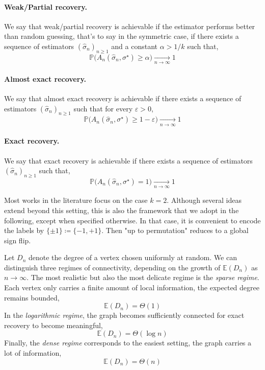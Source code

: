 \documentclass[runningheads]{llncs}
\begin{document}
\paragraph{Weak/Partial recovery.}
We say that weak/partial recovery is achievable if the estimator performs better than random guessing, that's to say in the symmetric case, if there exists a sequence of estimators \((\hat{\sigma}_n)_{n\geq 1}\) and a constant \(\alpha>1/k\) such that,
\[
\mathbb P\bigl(A_n(\hat{\sigma}_n,\sigma^\star)\geq \alpha\bigr)\xrightarrow[n\to\infty]{} 1
\]
\paragraph{Almost exact recovery.}
We say that almost exact recovery is achievable if there exists a sequence of estimators \((\hat{\sigma}_n)_{n\geq 1}\) such that for every \(\varepsilon>0\),
\[
\mathbb P\bigl(A_n(\hat{\sigma}_n,\sigma^\star)\geq 1-\varepsilon\bigr)\xrightarrow[n\to\infty]{} 1
\]
\paragraph{Exact recovery.}
We say that exact recovery is achievable if there exists a sequence of estimators \((\hat{\sigma}_n)_{n\geq 1}\) such that,
\[
\mathbb P\bigl(A_n(\hat{\sigma}_n,\sigma^\star)=1\bigr)\xrightarrow[n\to\infty]{} 1
\]

Most works in the literature focus on the case \(k=2\). Although several ideas extend beyond this setting, this is also the framework that we adopt in the following, except when specified otherwise. In that case, it is convenient to encode the labels by \(\{\pm1\}\coloneqq \{-1,+1\}\). Then "up to permutation" reduces to a global sign flip.


Let \(D_n\) denote the degree of a vertex chosen uniformly at random. We can distinguish three regimes of connectivity, depending on the growth of \(\mathbb E(D_n) \) as \(n\to\infty\).
The most realistic but also the most delicate regime is the \emph{sparse regime}. Each vertex only carries a finite amount of local information, the expected degree remains bounded,
\[
\mathbb E(D_n)=\Theta(1)
\]
In the \emph{logarithmic regime}, the graph becomes sufficiently connected for exact recovery to become meaningful, 
\[
\mathbb E(D_n)=\Theta(\log n)
\]
Finally, the \emph{dense regime} corresponds to the easiest setting, the graph carries a lot of information,
\[
\mathbb E(D_n)=\Theta(n)
\] 
\end{document}
